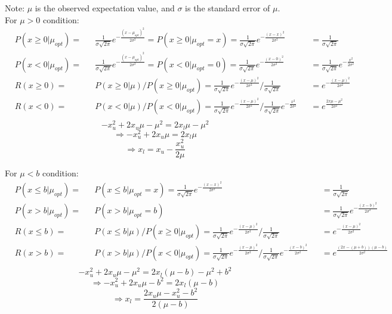 \documentclass{article}
\begin{document}
Note: $\mu$ is the observed expectation value, and $\sigma$ is the standard error of $\mu$.\\
For $\mu > 0$ condition:
\[
\begin{aligned}
	&P(x \ge 0|\mu_{opt}) = &&\frac{1}{\sigma\sqrt{2\pi}}e^{-\frac{(x-\mu_{opt})^2}{2\sigma^2}} = P(x \ge 0|\mu_{opt} = x) = \frac{1}{\sigma\sqrt{2\pi}}e^{-\frac{(x-x)^2}{2\sigma^2}}&& = \frac{1}{\sigma\sqrt{2\pi}}\\
	&P(x < 0|\mu_{opt}) = &&\frac{1}{\sigma\sqrt{2\pi}}e^{-\frac{(x-\mu_{opt})^2}{2\sigma^2}} = P(x < 0|\mu_{opt} = 0) = \frac{1}{\sigma\sqrt{2\pi}}e^{-\frac{(x-0)^2}{2\sigma^2}}&& = \frac{1}{\sigma\sqrt{2\pi}}e^{-\frac{x^2}{2\sigma^2}}\\
	&R(x \ge 0) =  &&P(x \ge 0|\mu)/P(x \ge 0|\mu_{opt}) =  \frac{1}{\sigma\sqrt{2\pi}}e^{-\frac{(x-\mu)^2}{2\sigma^2}}/\frac{1}{\sigma\sqrt{2\pi}}&& = e^{-\frac{(x-\mu)^2}{2\sigma^2}}\\
	&R(x < 0) =  &&P(x < 0|\mu)/P(x < 0|\mu_{opt}) =  \frac{1}{\sigma\sqrt{2\pi}}e^{-\frac{(x-\mu)^2}{2\sigma^2}}/\frac{1}{\sigma\sqrt{2\pi}}e^{-\frac{x^2}{2\sigma^2}}&& = e^{\frac{2x\mu - \mu^2}{2\sigma^2}}\\
\end{aligned}
\]
\[
	-x_u^2 + 2x_u\mu - \mu^2 = 2x_l\mu - \mu^2
\]
\[
	\Rightarrow -x_u^2 + 2x_u\mu  = 2x_l\mu
\]
\[
	\Rightarrow x_l = x_u - \frac{x_u^2}{2\mu}
\]

For $\mu < b$ condition:
\[
\begin{aligned}
	&P(x \le b|\mu_{opt}) = &&P(x \le b|\mu_{opt} = x) = \frac{1}{\sigma\sqrt{2\pi}}e^{-\frac{(x-x)^2}{2\sigma^2}}&& = \frac{1}{\sigma\sqrt{2\pi}}\\
	&P(x > b|\mu_{opt}) = &&P(x > b|\mu_{opt} = b)&& = \frac{1}{\sigma\sqrt{2\pi}}e^{-\frac{(x-b)^2}{2\sigma^2}}\\
	&R(x \le b) =  &&P(x \le b|\mu)/P(x \ge 0|\mu_{opt}) =  \frac{1}{\sigma\sqrt{2\pi}}e^{-\frac{(x-\mu)^2}{2\sigma^2}}/\frac{1}{\sigma\sqrt{2\pi}}&& = e^{-\frac{(x-\mu)^2}{2\sigma^2}}\\
	&R(x > b) =  &&P(x > b|\mu)/P(x < 0|\mu_{opt}) =  \frac{1}{\sigma\sqrt{2\pi}}e^{-\frac{(x-\mu)^2}{2\sigma^2}}/\frac{1}{\sigma\sqrt{2\pi}}e^{-\frac{(x-b)^2}{2\sigma^2}}&& = e^{\frac{(2x-(\mu+b))(\mu-b)}{2\sigma^2}}\\
\end{aligned}
\]
\[
	-x_u^2 + 2x_u\mu - \mu^2 = 2x_l(\mu-b) - \mu^2 + b^2
\]
\[
	\Rightarrow -x_u^2 + 2x_u\mu -b^2 = 2x_l(\mu-b)
\]
\[
	\Rightarrow x_l = \frac{2x_u\mu - x_u^2 - b^2}{2(\mu-b)}
\]

 
\end{document}

